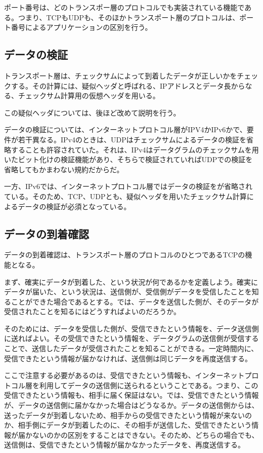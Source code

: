 ポート番号は、どのトランスポー層のプロトコルでも実装されている機能である。つまり、TCPもUDPも、そのほかトランスポート層のプロトコルは、ポート番号によるアプリケーションの区別を行う。

\subsection{データの検証}
トランスポート層は、チェックサムによって到着したデータが正しいかをチェックする。その計算には、疑似ヘッダと呼ばれる、IPアドレスとデータ長からなる、チェックサム計算用の仮想ヘッダを用いる。

この疑似ヘッダについては、後ほど改めて説明を行う。

データの検証については、インターネットプロトコル層がIPV4かIPv6かで、要件が若干異なる。IPv4のときは、UDPはチェックサムによるデータの検証を省略することも許容されていた。それは、IPv4はデータグラムのチェックサムを用いたビット化けの検証機能があり、そちらで検証されていればUDPでの検証を省略してもかまわない規約だからだ。

一方、IPv6では、インターネットプロトコル層ではデータの検証をが省略されている。そのため、TCP、UDPとも、疑似ヘッダを用いたチェックサム計算によるデータの検証が必須となっている。

\subsection{データの到着確認}

データの到着確認は、トランスポート層のプロトコルのひとつであるTCPの機能となる。

まず、確実にデータが到着した、という状況が何であるかを定義しよう。確実にデータが届いた、という状況は、送信側が、受信側がデータを受信したことを知ることができた場合であるとする。では、データを送信した側が、そのデータが受信されたことを知るにはどうすればよいのだろうか。

そのためには、データを受信した側が、受信できたという情報を、データ送信側に送ればよい。その受信できたという情報を、データグラムの送信側が受信することで、送信したデータが受信されたことを知ることができる。一定時間内に、受信できたという情報が届かなければ、送信側は同じデータを再度送信する。

ここで注意する必要があるのは、受信できたという情報も、インターネットプロトコル層を利用してデータの送信側に送られるということである。つまり、この受信できたという情報も、相手に届く保証はない。では、受信できたという情報が、データの送信側に届かなかった場合はどうなるか。データの送信側からは、送ったデータが到着しないため、相手からの受信できたという情報が来ないのか、相手側にデータが到着したのに、その相手が送信した、受信できたという情報が届かないのかの区別をすることはできない。そのため、どちらの場合でも、送信側は、受信できたという情報が届かなかったデータを、再度送信する。

